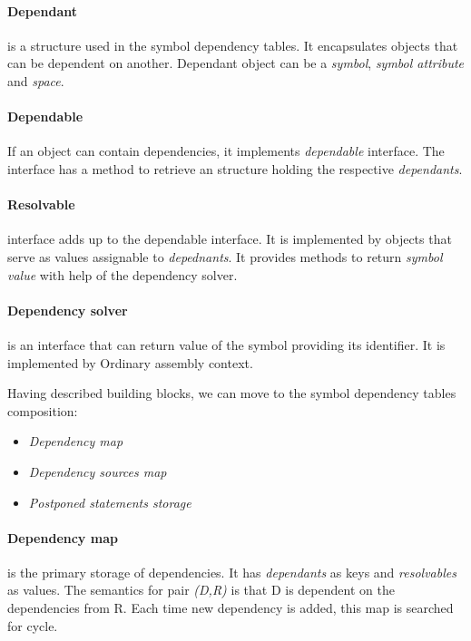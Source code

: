\paragraph*{Dependant} is a structure used in the symbol dependency tables. It encapsulates objects that can be dependent on another. Dependant object can be a \emph{symbol}, \emph{symbol attribute} and \emph{space}.

\paragraph*{Dependable} If an object can contain dependencies, it implements \emph{dependable} interface. The interface has a method to retrieve an structure holding the respective \emph{dependants}. 

\paragraph*{Resolvable} interface adds up to the dependable interface. It is implemented by objects that serve as values assignable to \emph{depednants}. It provides methods to return \emph{symbol value} with help of the dependency solver. 

\paragraph*{Dependency solver} is an interface that can return value of the symbol providing its identifier. It is implemented by Ordinary assembly context.

\vspace{0.5cm}

Having described building blocks, we can move to the symbol dependency tables composition:
\begin{itemize}
	\item \emph{Dependency map}
	\item \emph{Dependency sources map}
	\item \emph{Postponed statements storage}
\end{itemize}

\paragraph*{Dependency map} is the primary storage of dependencies. It has \emph{dependants} as keys and \emph{resolvables} as values. The semantics for pair \emph{(D,R)} is that D is dependent on the dependencies from R. Each time new dependency is added, this map is searched for cycle.

